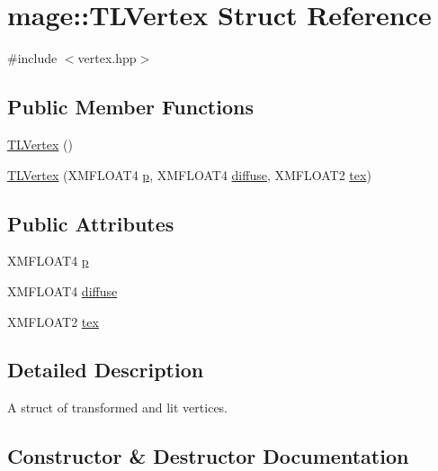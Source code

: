 \hypertarget{structmage_1_1_t_l_vertex}{}\section{mage\+:\+:T\+L\+Vertex Struct Reference}
\label{structmage_1_1_t_l_vertex}


{\ttfamily \#include $<$vertex.\+hpp$>$}

\subsection*{Public Member Functions}
\begin{DoxyCompactItemize}
\item 
\hyperlink{structmage_1_1_t_l_vertex_a281016b2cd959f1084fb69292b2e0609}{T\+L\+Vertex} ()
\item 
\hyperlink{structmage_1_1_t_l_vertex_a13b34e43c6f2d76b2336f3efe23b1cf9}{T\+L\+Vertex} (X\+M\+F\+L\+O\+A\+T4 \hyperlink{structmage_1_1_t_l_vertex_a5ac68e9f9767dae9455134891712baf1}{p}, X\+M\+F\+L\+O\+A\+T4 \hyperlink{structmage_1_1_t_l_vertex_a78d60c6622bc1091f2c1c30da0715236}{diffuse}, X\+M\+F\+L\+O\+A\+T2 \hyperlink{structmage_1_1_t_l_vertex_a17f1147ee6b76ea2e99364ed008c1ea2}{tex})
\end{DoxyCompactItemize}
\subsection*{Public Attributes}
\begin{DoxyCompactItemize}
\item 
X\+M\+F\+L\+O\+A\+T4 \hyperlink{structmage_1_1_t_l_vertex_a5ac68e9f9767dae9455134891712baf1}{p}
\item 
X\+M\+F\+L\+O\+A\+T4 \hyperlink{structmage_1_1_t_l_vertex_a78d60c6622bc1091f2c1c30da0715236}{diffuse}
\item 
X\+M\+F\+L\+O\+A\+T2 \hyperlink{structmage_1_1_t_l_vertex_a17f1147ee6b76ea2e99364ed008c1ea2}{tex}
\end{DoxyCompactItemize}


\subsection{Detailed Description}
A struct of transformed and lit vertices. 

\subsection{Constructor \& Destructor Documentation}
\hypertarget{structmage_1_1_t_l_vertex_a281016b2cd959f1084fb69292b2e0609}{}\label{structmage_1_1_t_l_vertex_a281016b2cd959f1084fb69292b2e0609} 

